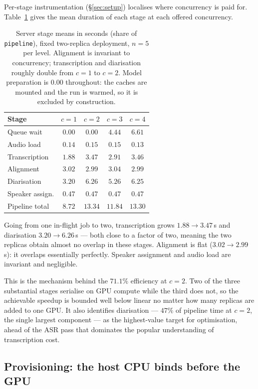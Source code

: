 \documentclass[10pt]{article}
\begin{document}
Per-stage instrumentation (\S\ref{sec:setup}) localises where concurrency is
paid for. Table~\ref{tab:stages} gives the mean duration of each stage at each
offered concurrency.

\begin{table}[t]
\centering
\caption{Server stage means in seconds (share of \texttt{pipeline}), fixed
two-replica deployment, $n=5$ per level. Alignment is invariant to concurrency;
transcription and diarisation roughly double from $c=1$ to $c=2$. Model
preparation is $0.00$ throughout: the caches are mounted and the run is warmed,
so it is excluded by construction.}
\label{tab:stages}
\begin{tabular}{lcccc}
\toprule
Stage & $c=1$ & $c=2$ & $c=3$ & $c=4$ \\
\midrule
Queue wait        & $0.00$ & $0.00$ & $4.44$ & $6.61$ \\
Audio load        & $0.14$ & $0.15$ & $0.15$ & $0.13$ \\
Transcription     & $1.88$ & $3.47$ & $2.91$ & $3.46$ \\
Alignment         & $3.02$ & $2.99$ & $3.04$ & $2.99$ \\
Diarisation       & $3.20$ & $6.26$ & $5.26$ & $6.25$ \\
Speaker assign.   & $0.47$ & $0.47$ & $0.47$ & $0.47$ \\
\midrule
Pipeline total    & $8.72$ & $13.34$ & $11.84$ & $13.30$ \\
\bottomrule
\end{tabular}
\end{table}

Going from one in-flight job to two, transcription grows $1.88 \to 3.47$\,s and
diarisation $3.20 \to 6.26$\,s --- both close to a factor of two, meaning the
two replicas obtain almost no overlap in these stages. Alignment is flat
($3.02 \to 2.99$\,s): it overlaps essentially perfectly. Speaker assignment and
audio load are invariant and negligible.

This is the mechanism behind the $71.1\%$ efficiency at $c=2$. Two of the three
substantial stages serialise on GPU compute while the third does not, so the
achievable speedup is bounded well below linear no matter how many replicas are
added to one GPU. It also identifies diarisation --- $47\%$ of pipeline time at
$c=2$, the single largest component --- as the highest-value target for
optimisation, ahead of the ASR pass that dominates the popular understanding of
transcription cost.

\subsection{Provisioning: the host CPU binds before the GPU}
\label{sec:capacity}
\end{document}
